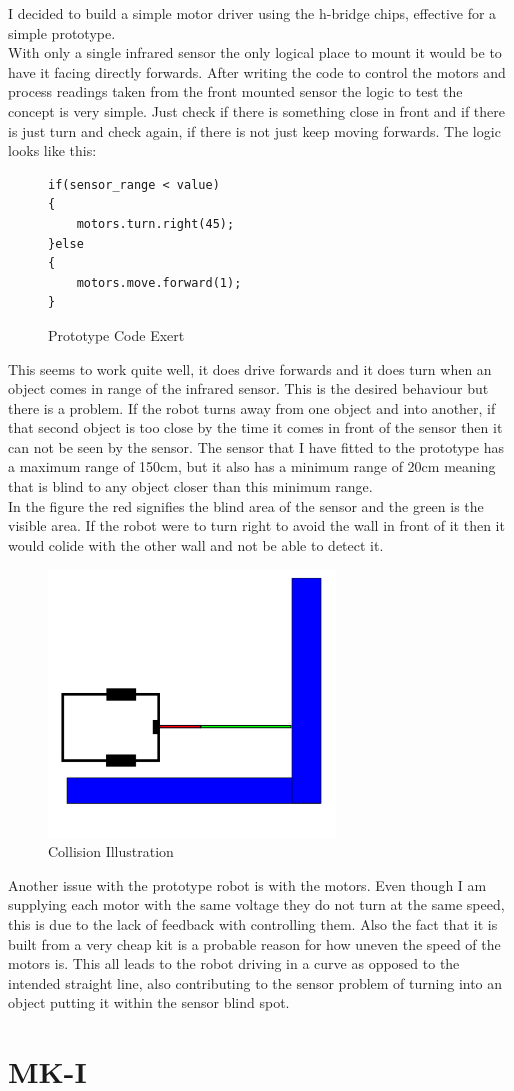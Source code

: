 I decided to build a simple motor driver using the h-bridge chips, effective for a simple prototype.
\\With only a single infrared sensor the only logical place to mount it would be to have it facing directly forwards.  After writing the code to control the motors and process readings taken from the front mounted sensor the logic to test the concept is very simple.  Just check if there is something close in front and if there is just turn and check again, if there is not just keep moving forwards.
The logic looks like this:
\begin{figure}[h]
\begin{lstlisting}[basicstyle=\ttfamily]
if(sensor_range < value)
{
	motors.turn.right(45);
}else
{
	motors.move.forward(1);
}
\end{lstlisting}
\caption{Prototype Code Exert}
\label{Prototype Code Exert}
\end{figure}
This seems to work quite well, it does drive forwards and it does turn when an object comes in range of the infrared sensor.  This is the desired behaviour but there is a problem.  If the robot turns away from one object and into another, if that second object is too close by the time it comes in front of the sensor then it can not be seen by the sensor.  The sensor that I have fitted to the prototype has a maximum range of 150cm, but it also has a minimum range of 20cm meaning that is blind to any object closer than this minimum range.
\\In the figure the red signifies the blind area of the sensor and the green is the visible area.  If the robot were to turn right to avoid the wall in front of it then it would colide with the other wall and not be able to detect it.
\begin{figure}[h]
\centering
        \includegraphics[width=3.0in]  {Images/ir-demo.png}
        \caption{Collision Illustration}
        \label{Collision Illustration}
\end{figure}
Another issue with the prototype robot is with the motors.  Even though I am supplying each motor with the same voltage they do not turn at the same speed, this is due to the lack of feedback with controlling them.  Also the fact that it is built from a very cheap kit is a probable reason for how uneven the speed of the motors is.  This all leads to the robot driving in a curve as opposed to the intended straight line, also contributing to the sensor problem of turning into an object putting it within the sensor blind spot.
\section{MK-I}

